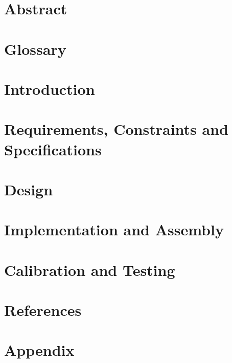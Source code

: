 \documentclass[12pt]{article}
\begin{document}
	
	
	\setcounter{page}{0}
	\newpage
	
	\section*{Abstract}
	
	\pagebreak
	
	\tableofcontents
	\pagebreak
	
	\listoffigures
	\pagebreak
	\listoftables
	\pagebreak
	\section*{Glossary}
	
	\pagebreak
	
	\section{Introduction}
	\label{sec:intro}
	
	
	\section{Requirements, Constraints and Specifications}
	\label{sec:requirements}
	
	\pagebreak
	
	\section{Design}
	\label{sec:design}
	
	\pagebreak
	
 	\section{Implementation and Assembly}
 	\label{sec:implementation}
	
	\pagebreak
	
	\section{Calibration and Testing}
	\label{sec:calibration}
	
	\pagebreak
	
	\section{References}
	\label{sec:ref}
	\printbibliography[heading=none]
	\pagebreak
	
	\section{Appendix}
	\label{sec:appendix}
	
	
\end{document}
